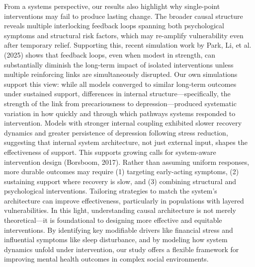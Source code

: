 \documentclass[
]{article}
\begin{document}
From a systems perspective, our results also highlight why single-point
interventions may fail to produce lasting change. The broader causal
structure reveals multiple interlocking feedback loops spanning both
psychological symptoms and structural risk factors, which may re-amplify
vulnerability even after temporary relief. Supporting this, recent
simulation work by Park, Li, et al. (2025) shows that feedback loops,
even when modest in strength, can substantially diminish the long-term
impact of isolated interventions unless multiple reinforcing links are
simultaneously disrupted. Our own simulations support this view: while
all models converged to similar long-term outcomes under sustained
support, differences in internal structure---specifically, the strength
of the link from precariousness to depression---produced systematic
variation in how quickly and through which pathways systems responded to
intervention. Models with stronger internal coupling exhibited slower
recovery dynamics and greater persistence of depression following stress
reduction, suggesting that internal system architecture, not just
external input, shapes the effectiveness of support. This supports
growing calls for system-aware intervention design (Borsboom, 2017).
Rather than assuming uniform responses, more durable outcomes may
require (1) targeting early-acting symptoms, (2) sustaining support
where recovery is slow, and (3) combining structural and psychological
interventions. Tailoring strategies to match the system's architecture
can improve effectiveness, particularly in populations with layered
vulnerabilities. In this light, understanding causal architecture is not
merely theoretical---it is foundational to designing more effective and
equitable interventions. By identifying key modifiable drivers like
financial stress and influential symptoms like sleep disturbance, and by
modeling how system dynamics unfold under intervention, our study offers
a flexible framework for improving mental health outcomes in complex
social environments.
\end{document}
